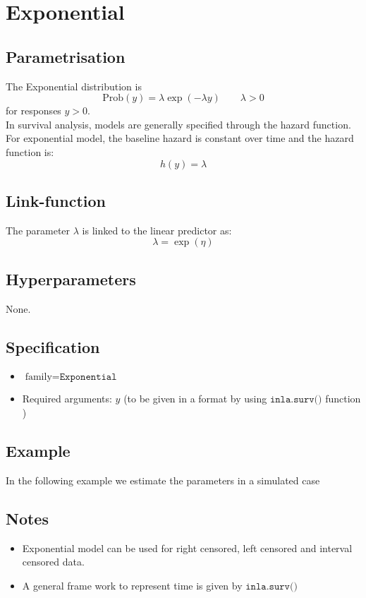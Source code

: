 \documentclass[a4paper,11pt]{article}
\begin{document}
\section*{Exponential}

\subsection*{Parametrisation}

The Exponential distribution is
\begin{displaymath}
    \text{Prob}(y) = \lambda \exp(-\lambda y)\qquad \lambda > 0
\end{displaymath}
for responses $y>0$.\\
In survival analysis, models are generally specified through the hazard function. For exponential  model, the baseline hazard is constant over time and the hazard function is:
\begin{displaymath}
h(y)  = \lambda
\end{displaymath}

\subsection*{Link-function}
The parameter $\lambda$ is linked to the linear predictor as:
\[
\lambda = \exp(\eta)
\]

\subsection*{Hyperparameters}

None.

\subsection*{Specification}

\begin{itemize}
\item $\text{family}=\texttt{Exponential}$
\item Required arguments: $y$ (to be given in a format by using $\texttt{inla.surv()}$ function )
\end{itemize}

\subsection*{Example}

In the following example we estimate the parameters in a simulated
case


\subsection*{Notes}
\begin{itemize}
\item Exponential model can be used for right censored, left censored and interval censored data.\\
\item A general frame work to represent time is given by $\texttt{inla.surv()}$  
\end{itemize}
\end{document}
